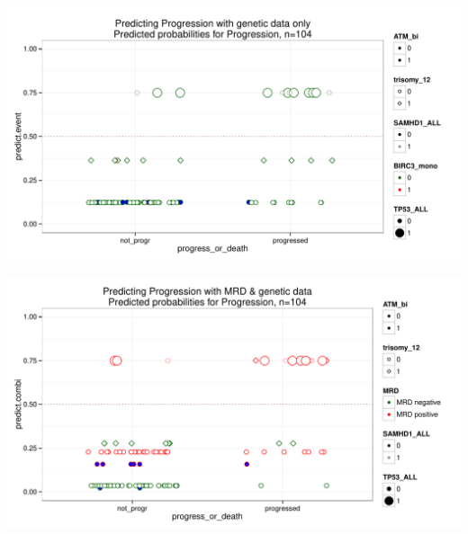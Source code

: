 \documentclass[a4paper,11pt]{article}
\begin{document}
\includegraphics{HICF1_Finalreportv6-044}

\includegraphics{HICF1_Finalreportv6-045}
\end{document}
